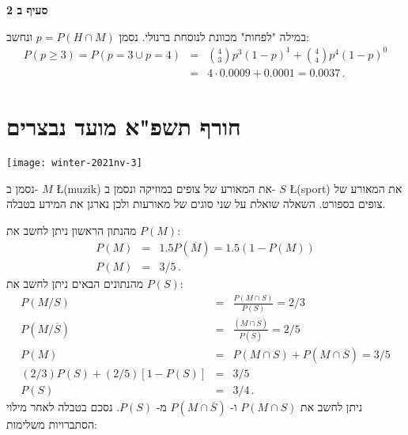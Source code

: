 \textbf{סעיף ב 2}

במילה "לפחות" מכוונת לנוסחת ברנולי. נסמן
$p=P(H\cap M)$
ונחשב:
\begin{eqnarray*}
P(p\geq 3) = P(p=3 \cup p=4)&=& {4\choose 3}p^3(1-p)^1+{4\choose 4}p^4(1-p)^0\\[6pt]
&=&4\cdot 0.0009 + 0.0001 = 0.0037\,.
\end{eqnarray*}


\newpage

\section{חורף תשפ"א מועד נבצרים}

\begin{center}
\texttt{[image: winter-2021nv-3]}
\end{center}

נסמן ב-%
$M$ \L{(muzik)}
את המאורע של צופים במוזיקה ונסמן ב-%
$S$ \L{(sport)}
את המאורע של צופים בספורט. השאלה שואלת על שני סוגים של מאורעות ולכן נארגן את המידע בטבלה.

מהנתון הראשון ניתן לחשב את
$P(M)$:
\begin{eqnarray*}
P(M)&=&1.5P(\overline{M})=1.5 (1-P(M))\\
P(M)&=&3/5\,.
\end{eqnarray*}
מהנתונים הבאים ניתן לחשב את
$P(S)$:
\begin{eqnarray*}
P(M/S)&=&\frac{P(M\cap S)}{P(S)}=2/3\\
P(M/\overline{S})&=&\frac{(M\cap \overline{S})}{P(\overline{S})}=2/5\\
P(M)&=&P(M\cap S)+P(M\cap \overline{S})=3/5\\
(2/3)P(S)+(2/5)[1-P(S)]&=&3/5\\
P(S)&=&3/4\,.
\end{eqnarray*}
ניתן לחשב את
$P(M\cap S)$
ו-%
$P(M\cap \overline{S})$
מ-%
$P(S)$.
נסכם בטבלה לאחר מילוי הסתברויות משלימות:
\begin{center}
\end{center}

